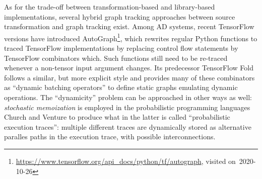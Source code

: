 As for the trade-off between transformation-based and library-based implementations, several hybrid
graph tracking approaches between source transformation and graph tracking exist.  Among AD systems,
recent TensorFlow versions have introduced
AutoGraph\footnote{\url{https://www.tensorflow.org/api_docs/python/tf/autograph}, visited
  on~2020-10-26}, which rewrites regular Python functions to traced TensorFlow implementations by
replacing control flow statements by TensorFlow combinators which.  Such functions still need to be
re-traced whenever a non-tensor input argument changes.  Its predecessor TensorFlow Fold
\parencite{looks2017deep} follows a similar, but more explicit style and provides many of these
combinators as \enquote{dynamic batching operators} to define static graphs emulating dynamic
operations.  The \enquote{dynamicity} problem can be approached in other ways as well:
\emph{stochastic memoization} is employed in the probabilistic programming languages Church
\parencite{goodman2012church} and Venture \parencite{mansinghka2014venture} to produce what in the
latter is called \enquote{probabilistic execution traces}: multiple different traces are dynamically
stored as alternative paralles paths in the execution trace, with possible interconnections.


